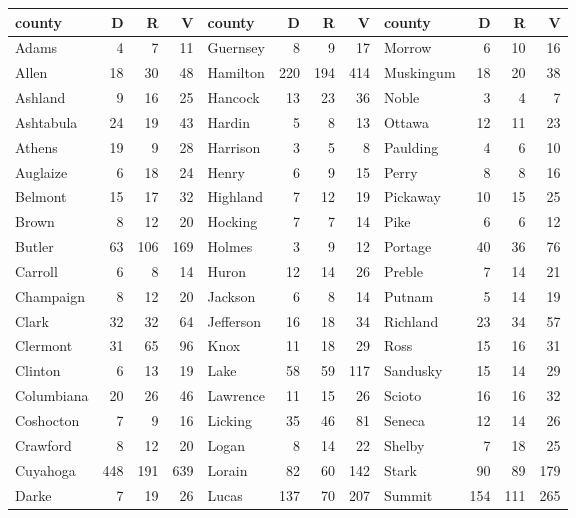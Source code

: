 \begingroup\small
\begin{tabular}{lrrrlrrrlrrr}
  \hline
county & D & R & V & county & D & R & V & county & D & R & V \\ 
  \hline
Adams &   4 &   7 &  11 & Guernsey &   8 &   9 &  17 & Morrow &   6 &  10 &  16 \\ 
  Allen &  18 &  30 &  48 & Hamilton & 220 & 194 & 414 & Muskingum &  18 &  20 &  38 \\ 
  Ashland &   9 &  16 &  25 & Hancock &  13 &  23 &  36 & Noble &   3 &   4 &   7 \\ 
  Ashtabula &  24 &  19 &  43 & Hardin &   5 &   8 &  13 & Ottawa &  12 &  11 &  23 \\ 
  Athens &  19 &   9 &  28 & Harrison &   3 &   5 &   8 & Paulding &   4 &   6 &  10 \\ 
  Auglaize &   6 &  18 &  24 & Henry &   6 &   9 &  15 & Perry &   8 &   8 &  16 \\ 
  Belmont &  15 &  17 &  32 & Highland &   7 &  12 &  19 & Pickaway &  10 &  15 &  25 \\ 
  Brown &   8 &  12 &  20 & Hocking &   7 &   7 &  14 & Pike &   6 &   6 &  12 \\ 
  Butler &  63 & 106 & 169 & Holmes &   3 &   9 &  12 & Portage &  40 &  36 &  76 \\ 
  Carroll &   6 &   8 &  14 & Huron &  12 &  14 &  26 & Preble &   7 &  14 &  21 \\ 
  Champaign &   8 &  12 &  20 & Jackson &   6 &   8 &  14 & Putnam &   5 &  14 &  19 \\ 
  Clark &  32 &  32 &  64 & Jefferson &  16 &  18 &  34 & Richland &  23 &  34 &  57 \\ 
  Clermont &  31 &  65 &  96 & Knox &  11 &  18 &  29 & Ross &  15 &  16 &  31 \\ 
  Clinton &   6 &  13 &  19 & Lake &  58 &  59 & 117 & Sandusky &  15 &  14 &  29 \\ 
  Columbiana &  20 &  26 &  46 & Lawrence &  11 &  15 &  26 & Scioto &  16 &  16 &  32 \\ 
  Coshocton &   7 &   9 &  16 & Licking &  35 &  46 &  81 & Seneca &  12 &  14 &  26 \\ 
  Crawford &   8 &  12 &  20 & Logan &   8 &  14 &  22 & Shelby &   7 &  18 &  25 \\ 
  Cuyahoga & 448 & 191 & 639 & Lorain &  82 &  60 & 142 & Stark &  90 &  89 & 179 \\ 
  Darke &   7 &  19 &  26 & Lucas & 137 &  70 & 207 & Summit & 154 & 111 & 265 \\ 

\end{tabular}
